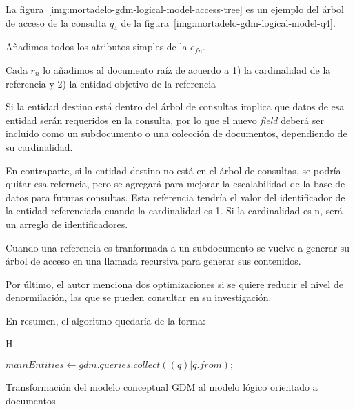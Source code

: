 La figura~\ref{img:mortadelo-gdm-logical-model-access-tree} es un ejemplo del árbol de acceso de la consulta $q_{4}$ de la figura~\ref{img:mortadelo-gdm-logical-model-q4}.


Añadimos todos los atributos simples de la $e_{fn}$.


Cada $r_{n}$ lo añadimos al documento raíz de acuerdo a 1) la cardinalidad de la referencia y 2) la entidad objetivo de la referencia


Si la entidad destino está dentro del árbol de consultas implica que datos de esa entidad serán requeridos en la consulta, por lo que el nuevo \textit{field} deberá ser incluído como un subdocumento o una colección de documentos, dependiendo de su cardinalidad.

En contraparte, si la entidad destino no está en el árbol de consultas, se podría quitar esa referncia, pero se agregará para mejorar la escalabilidad de la base de datos para futuras consultas. Esta referencia tendría el valor del identificador de la entidad referenciada cuando la cardinalidad es 1. Si la cardinalidad es n, será un arreglo de identificadores.


Cuando una referencia es tranformada a un subdocumento se vuelve a generar su árbol de acceso en una llamada recursiva para generar sus contenidos.


Por último, el autor menciona dos optimizaciones si se quiere reducir el nivel de denormilación, las que se pueden consultar en su investigación\cite{de_la_vega_mortadelo_2020}.

En resumen, el algoritmo quedaría de la forma:
\begin{algorithm}{H}

    $mainEntities \gets gdm.queries.collect((q)|q.from);$\\
    
    \caption{Transformación del modelo conceptual GDM al modelo lógico orientado a documentos}
\end{algorithm}

